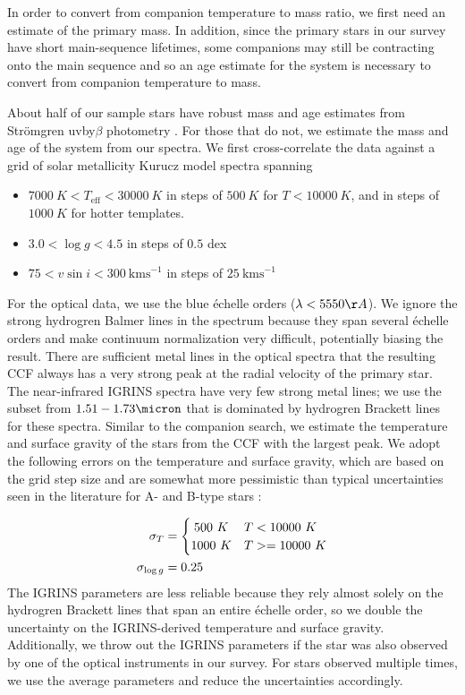 \documentclass{emulateapj}
\begin{document}
In order to convert from companion temperature to mass ratio, we first need an estimate of the primary mass. In addition, since the primary stars in our survey have short main-sequence lifetimes, some companions may still be contracting onto the main sequence and so an age estimate for the system is necessary to convert from companion temperature to mass.

About half of our sample stars have robust mass and age estimates from Str\"omgren uvby$\beta$ photometry \citep{David2015}. For those that do not, we estimate the mass and age of the system from our spectra. We first cross-correlate the data against a grid of solar metallicity Kurucz model spectra \citep{Castelli2003} spanning

\begin{itemize}
\item $7000\ K < T_\mathrm{eff} < 30000\ K$ in steps of $500\ K$ for $T < 10000\ K$, and in steps of $1000\ K$ for hotter templates.
\item $3.0 < \log{g} < 4.5$ in steps of $0.5$ dex
\item $75 < v\sin{i} < 300\ \mathrm{km s}^{-1}$ in steps of $25\ \mathrm{km s}^{-1}$
\end{itemize}


For the optical data, we use the blue \'echelle orders ($\lambda < 5550 \AA$). We ignore the strong hydrogren Balmer lines in the spectrum because they span several \'echelle orders and make continuum normalization very difficult, potentially biasing the result. There are sufficient metal lines in the optical spectra that the resulting CCF always has a very strong peak at the radial velocity of the primary star. The near-infrared IGRINS spectra have very few strong metal lines; we use the subset from $1.51 - 1.73 \micron$ that is dominated by hydrogren Brackett lines for these spectra. Similar to the companion search, we estimate the temperature and surface gravity of the stars from the CCF with the largest peak. We adopt the following errors on the temperature and surface gravity, which are based on the grid step size and are somewhat more pessimistic than typical uncertainties seen in the literature for A- and B-type stars \citep[e.g.][]{Aydi2014, David2015}:

\begin{align}
 \sigma_T &= \begin{cases}
      \hfill 500\ K \hfill & T < 10000\ K \\
      \hfill 1000\ K \hfill & T >= 10000\ K \\
     \end{cases} \\
 \sigma_{\log{g}} &= 0.25
\end{align}
The IGRINS parameters are less reliable because they rely almost solely on the hydrogren Brackett lines that span an entire \'echelle order, so we double the uncertainty on the IGRINS-derived temperature and surface gravity. Additionally, we throw out the IGRINS parameters if the star was also observed by one of the optical instruments in our survey. For stars observed multiple times, we use the average parameters and reduce the uncertainties accordingly.
\end{document}

